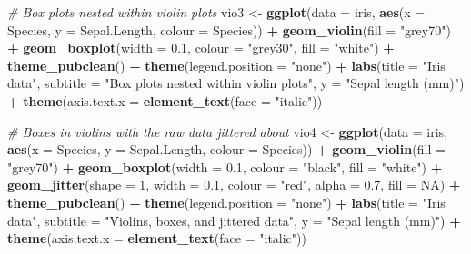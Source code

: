 \documentclass[english,10pt,a4paper,oneside]{book}
\newenvironment{Shaded}{\begin{snugshade}}{\end{snugshade}}
\newcommand{\CommentTok}[1]{\textcolor[rgb]{0.56,0.35,0.01}{\textit{#1}}}
\newcommand{\DataTypeTok}[1]{\textcolor[rgb]{0.13,0.29,0.53}{#1}}
\newcommand{\DecValTok}[1]{\textcolor[rgb]{0.00,0.00,0.81}{#1}}
\newcommand{\FloatTok}[1]{\textcolor[rgb]{0.00,0.00,0.81}{#1}}
\newcommand{\KeywordTok}[1]{\textcolor[rgb]{0.13,0.29,0.53}{\textbf{#1}}}
\newcommand{\NormalTok}[1]{#1}
\newcommand{\OperatorTok}[1]{\textcolor[rgb]{0.81,0.36,0.00}{\textbf{#1}}}
\newcommand{\OtherTok}[1]{\textcolor[rgb]{0.56,0.35,0.01}{#1}}
\newcommand{\StringTok}[1]{\textcolor[rgb]{0.31,0.60,0.02}{#1}}
\theoremstyle{definition}
\theoremstyle{definition}
\theoremstyle{definition}
\theoremstyle{remark}
\begin{document}
\begin{Shaded}
\begin{Highlighting}[]
\CommentTok{# Box plots nested within violin plots}
\NormalTok{vio3 <-}\StringTok{ }\KeywordTok{ggplot}\NormalTok{(}\DataTypeTok{data =}\NormalTok{ iris, }\KeywordTok{aes}\NormalTok{(}\DataTypeTok{x =}\NormalTok{ Species, }\DataTypeTok{y =}\NormalTok{ Sepal.Length, }\DataTypeTok{colour =}\NormalTok{ Species)) }\OperatorTok{+}
\StringTok{  }\KeywordTok{geom_violin}\NormalTok{(}\DataTypeTok{fill =} \StringTok{"grey70"}\NormalTok{) }\OperatorTok{+}\StringTok{ }
\StringTok{  }\KeywordTok{geom_boxplot}\NormalTok{(}\DataTypeTok{width =} \FloatTok{0.1}\NormalTok{, }\DataTypeTok{colour =} \StringTok{"grey30"}\NormalTok{, }\DataTypeTok{fill =} \StringTok{"white"}\NormalTok{) }\OperatorTok{+}
\StringTok{  }\KeywordTok{theme_pubclean}\NormalTok{() }\OperatorTok{+}\StringTok{ }\KeywordTok{theme}\NormalTok{(}\DataTypeTok{legend.position =} \StringTok{"none"}\NormalTok{) }\OperatorTok{+}
\StringTok{  }\KeywordTok{labs}\NormalTok{(}\DataTypeTok{title =} \StringTok{"Iris data"}\NormalTok{,}
       \DataTypeTok{subtitle =} \StringTok{"Box plots nested within violin plots"}\NormalTok{, }\DataTypeTok{y =} \StringTok{"Sepal length (mm)"}\NormalTok{) }\OperatorTok{+}
\StringTok{  }\KeywordTok{theme}\NormalTok{(}\DataTypeTok{axis.text.x =} \KeywordTok{element_text}\NormalTok{(}\DataTypeTok{face =} \StringTok{"italic"}\NormalTok{))}

\CommentTok{# Boxes in violins with the raw data jittered about}
\NormalTok{vio4 <-}\StringTok{ }\KeywordTok{ggplot}\NormalTok{(}\DataTypeTok{data =}\NormalTok{ iris, }\KeywordTok{aes}\NormalTok{(}\DataTypeTok{x =}\NormalTok{ Species, }\DataTypeTok{y =}\NormalTok{ Sepal.Length, }\DataTypeTok{colour =}\NormalTok{ Species)) }\OperatorTok{+}
\StringTok{  }\KeywordTok{geom_violin}\NormalTok{(}\DataTypeTok{fill =} \StringTok{"grey70"}\NormalTok{) }\OperatorTok{+}\StringTok{ }
\StringTok{  }\KeywordTok{geom_boxplot}\NormalTok{(}\DataTypeTok{width =} \FloatTok{0.1}\NormalTok{, }\DataTypeTok{colour =} \StringTok{"black"}\NormalTok{, }\DataTypeTok{fill =} \StringTok{"white"}\NormalTok{) }\OperatorTok{+}
\StringTok{  }\KeywordTok{geom_jitter}\NormalTok{(}\DataTypeTok{shape =} \DecValTok{1}\NormalTok{, }\DataTypeTok{width =} \FloatTok{0.1}\NormalTok{, }\DataTypeTok{colour =} \StringTok{"red"}\NormalTok{, }\DataTypeTok{alpha =} \FloatTok{0.7}\NormalTok{, }\DataTypeTok{fill =} \OtherTok{NA}\NormalTok{) }\OperatorTok{+}
\StringTok{  }\KeywordTok{theme_pubclean}\NormalTok{() }\OperatorTok{+}\StringTok{ }\KeywordTok{theme}\NormalTok{(}\DataTypeTok{legend.position =} \StringTok{"none"}\NormalTok{) }\OperatorTok{+}
\StringTok{  }\KeywordTok{labs}\NormalTok{(}\DataTypeTok{title =} \StringTok{"Iris data"}\NormalTok{,}
       \DataTypeTok{subtitle =} \StringTok{"Violins, boxes, and jittered data"}\NormalTok{, }\DataTypeTok{y =} \StringTok{"Sepal length (mm)"}\NormalTok{) }\OperatorTok{+}
\StringTok{  }\KeywordTok{theme}\NormalTok{(}\DataTypeTok{axis.text.x =} \KeywordTok{element_text}\NormalTok{(}\DataTypeTok{face =} \StringTok{"italic"}\NormalTok{))}


\end{Highlighting}
\end{Shaded}
\end{document}
